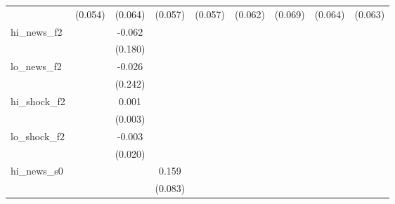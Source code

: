 {\begin{tabular}{l*{8}{c}}
            &     (0.054)         &     (0.064)         &     (0.057)         &     (0.057)         &     (0.062)         &     (0.069)         &     (0.064)         &     (0.063)         \\
\addlinespace
hi\_news\_f2  &                     &      -0.062         &                     &                     &                     &                     &                     &                     \\
            &                     &     (0.180)         &                     &                     &                     &                     &                     &                     \\
\addlinespace
lo\_news\_f2  &                     &      -0.026         &                     &                     &                     &                     &                     &                     \\
            &                     &     (0.242)         &                     &                     &                     &                     &                     &                     \\
\addlinespace
hi\_shock\_f2 &                     &       0.001         &                     &                     &                     &                     &                     &                     \\
            &                     &     (0.003)         &                     &                     &                     &                     &                     &                     \\
\addlinespace
lo\_shock\_f2 &                     &      -0.003         &                     &                     &                     &                     &                     &                     \\
            &                     &     (0.020)         &                     &                     &                     &                     &                     &                     \\
\addlinespace
hi\_news\_s0  &                     &                     &       0.159\sym{*}  &                     &                     &                     &                     &                     \\
            &                     &                     &     (0.083)         &                     &                     &                     &                     &                     \\

\end{tabular}}

